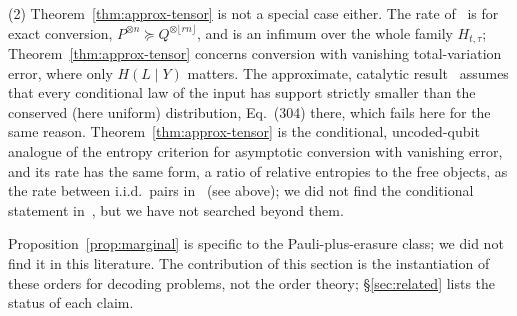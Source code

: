 (2) Theorem~\ref{thm:approx-tensor} is not a special case either. The rate of~\cite[Thm.~8.1]{RHT} is for exact conversion, $P^{\otimes n}\succeq Q^{\otimes\lfloor rn\rfloor}$, and is an infimum over the whole family $H_{t,\tau}$; Theorem~\ref{thm:approx-tensor} concerns conversion with vanishing total-variation error, where only $H(L\mid Y)$ matters. The approximate, catalytic result~\cite[Thm.~8.3]{RHT} assumes that every conditional law of the input has support strictly smaller than the conserved (here uniform) distribution, Eq.~(304) there, which fails here for the same reason. Theorem~\ref{thm:approx-tensor} is the conditional, uncoded-qubit analogue of the entropy criterion for asymptotic conversion with vanishing error, and its rate has the same form, a ratio of relative entropies to the free objects, as the rate between i.i.d.\ pairs in~\cite{WW19} (see above); we did not find the conditional statement in~\cite{MPST,FFHT,RHT}, but we have not searched beyond them.

Proposition~\ref{prop:marginal} is specific to the Pauli-plus-erasure class; we did not find it in this literature.
The contribution of this section is the instantiation of these orders for decoding problems, not the order theory; \S\ref{sec:related} lists the status of each claim.
